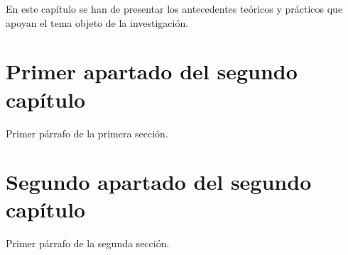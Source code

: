 

En este capítulo se han de presentar los antecedentes teóricos y prácticos que
apoyan el tema objeto de la investigación.


\section{Primer apartado del segundo capítulo}
\label{2:sec:1}
  Primer párrafo de la primera sección.

\section{Segundo apartado del segundo capítulo}
\label{2:sec:2}
  Primer párrafo de la segunda sección.

